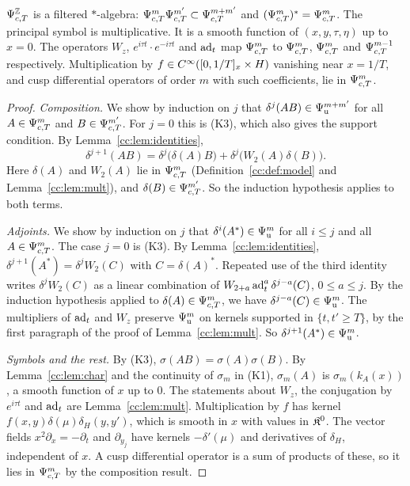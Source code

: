 \begin{theorem}\label{cc:thm:model}
\(\Psi_{c,T}^{\mathbb Z}\) is a filtered \(*\)-algebra:
\(\Psi_{c,T}^m\Psi_{c,T}^{m'}\subset\Psi_{c,T}^{m+m'}\) and
\((\Psi_{c,T}^m)^*=\Psi_{c,T}^m\). The principal symbol is multiplicative. It is
a smooth function of \((x,y,\tau,\eta)\) up to \(x=0\). The operators
\(W_z\), \(e^{i\tau t}\cdot e^{-i\tau t}\) and \(\operatorname{ad}_t\) map \(\Psi_{c,T}^m\)
to \(\Psi_{c,T}^m\), \(\Psi_{c,T}^m\) and \(\Psi_{c,T}^{m-1}\) respectively.
Multiplication by \(f\in C^\infty([0,1/T]_x\times H)\) vanishing near
\(x=1/T\), and cusp differential operators of order \(m\) with such
coefficients, lie in \(\Psi_{c,T}^m\).
\end{theorem}

\begin{proof}
\emph{Composition.} We show by induction on \(j\) that
\(\delta^j(AB)\in\Psi_{\mathrm u}^{m+m'}\) for all \(A\in\Psi_{c,T}^m\) and
\(B\in\Psi_{c,T}^{m'}\). For \(j=0\) this is (K3), which also gives the
support condition. By Lemma~\ref{cc:lem:identities},
\[
 \delta^{j+1}(AB)=\delta^j\bigl(\delta(A)B\bigr)
 +\delta^j\bigl(W_2(A)\delta(B)\bigr).
\]
Here \(\delta(A)\) and \(W_2(A)\) lie in \(\Psi_{c,T}^m\)
(Definition~\ref{cc:def:model} and Lemma~\ref{cc:lem:mult}), and
\(\delta(B)\in\Psi_{c,T}^{m'}\). So the induction hypothesis applies to both
terms.

\emph{Adjoints.} We show by induction on \(j\) that
\(\delta^i(A^*)\in\Psi_{\mathrm u}^m\) for all \(i\le j\) and all
\(A\in\Psi_{c,T}^m\). The case \(j=0\) is (K3). By
Lemma~\ref{cc:lem:identities}, \(\delta^{j+1}(A^*)=\delta^j
W_2(C)\) with \(C=\delta(A)^*\). Repeated use of the third identity
writes \(\delta^jW_2(C)\) as a linear combination of
\(W_{2+a}\operatorname{ad}_t^a\delta^{j-a}(C)\), \(0\le a\le j\). By the induction
hypothesis applied to \(\delta(A)\in\Psi_{c,T}^m\), we have
\(\delta^{j-a}(C)\in\Psi_{\mathrm u}^m\). The multipliers of \(\operatorname{ad}_t\) and \(W_z\)
preserve \(\Psi_{\mathrm u}^m\) on kernels supported in \(\{t,t'\ge T\}\), by the
first paragraph of the proof of Lemma~\ref{cc:lem:mult}. So
\(\delta^{j+1}(A^*)\in\Psi_{\mathrm u}^m\).

\emph{Symbols and the rest.} By (K3), \(\sigma(AB)=\sigma(A)\sigma(B)\).
By Lemma~\ref{cc:lem:char} and the continuity of \(\sigma_m\) in (K1),
\(\sigma_m(A)\) is \(\sigma_m(k_A(x))\), a smooth function of \(x\)
up to \(0\). The statements about \(W_z\), the conjugation by \(e^{i\tau
t}\) and \(\operatorname{ad}_t\) are Lemma~\ref{cc:lem:mult}. Multiplication by \(f\) has
kernel \(f(x,y)\delta(\mu)\delta_H(y,y')\), which is smooth in \(x\) with
values in \(\mathfrak K^0\). The vector fields \(x^2\partial_x=-\partial_t\) and
\(\partial_{y_j}\) have kernels \(-\delta'(\mu)\) and derivatives of
\(\delta_H\), independent of \(x\). A cusp differential operator is a sum
of products of these, so it lies in \(\Psi_{c,T}^m\) by the composition
result.
\end{proof}

